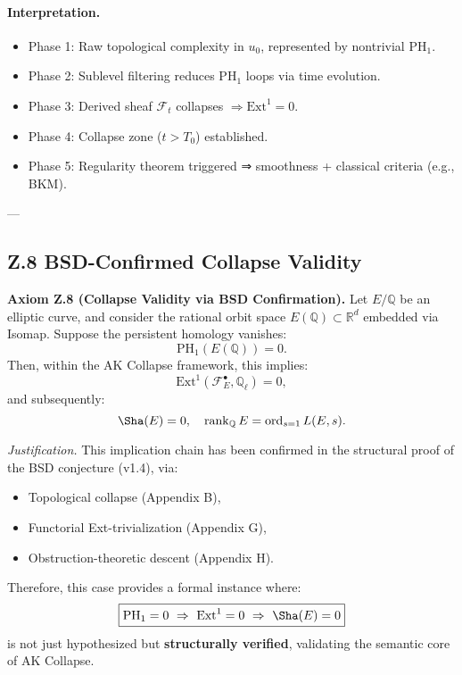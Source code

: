 \documentclass[11pt]{article}
\begin{document}
\begin{axiom}
\begin{axiom}
{{\paragraph{Interpretation.}
\begin{itemize}
  \item Phase 1: Raw topological complexity in $u_0$, represented by nontrivial $\mathrm{PH}_1$.
  \item Phase 2: Sublevel filtering reduces $\mathrm{PH}_1$ loops via time evolution.
  \item Phase 3: Derived sheaf $\mathcal{F}_t$ collapses $\Rightarrow \mathrm{Ext}^1 = 0$.
  \item Phase 4: Collapse zone ($t > T_0$) established.
  \item Phase 5: Regularity theorem triggered ⇒ smoothness + classical criteria (e.g., BKM).
\end{itemize}

---

\subsection*{Z.8 BSD-Confirmed Collapse Validity}

\textbf{Axiom Z.8 (Collapse Validity via BSD Confirmation).}  
Let \( E/\mathbb{Q} \) be an elliptic curve, and consider the rational orbit space \( E(\mathbb{Q}) \subset \mathbb{R}^d \) embedded via Isomap.  
Suppose the persistent homology vanishes:
\[
\mathrm{PH}_1(E(\mathbb{Q})) = 0.
\]
Then, within the AK Collapse framework, this implies:
\[
\mathrm{Ext}^1(\mathcal{F}_E^\bullet, \mathbb{Q}_\ell) = 0,
\]
and subsequently:
\[
\Sha(E) = 0, \quad \operatorname{rank}_\mathbb{Q} E = \operatorname{ord}_{s=1}L(E, s).
\]

\textit{Justification.}  
This implication chain has been confirmed in the structural proof of the BSD conjecture (v1.4),  
via:
\begin{itemize}
  \item Topological collapse (Appendix B),
  \item Functorial Ext-trivialization (Appendix G),
  \item Obstruction-theoretic descent (Appendix H).
\end{itemize}

Therefore, this case provides a formal instance where:
\[
\boxed{\mathrm{PH}_1 = 0 \ \Rightarrow \ \mathrm{Ext}^1 = 0 \ \Rightarrow \ \Sha(E) = 0}
\]
is not just hypothesized but \textbf{structurally verified}, validating the semantic core of AK Collapse.

}}
\end{axiom}
\end{axiom}
\end{document}
